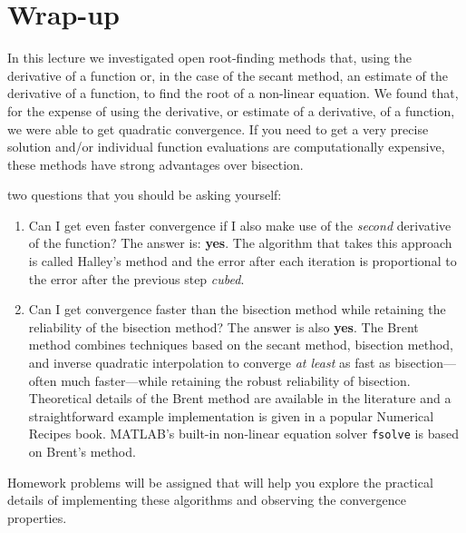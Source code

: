 \section{Wrap-up}
In this lecture we investigated open root-finding methods that, using the derivative of a function or, in the case of the secant method, an estimate of the derivative of a function, to find the root of a non-linear equation.  We found that, for the expense of using the derivative, or estimate of a derivative, of a function, we were able to get quadratic convergence.  If you need to get a very precise solution and/or individual function evaluations are computationally expensive, these methods have strong advantages over bisection.  

 two questions that you should be asking yourself:
\begin{enumerate}
\item Can I get even faster convergence if I also make use of the \emph{second} derivative of the function?  The answer is: \textbf{yes}.  The algorithm that takes this approach is called Halley's method\cite{gander1985halley} and the error after each iteration is proportional to the error after the previous step \emph{cubed}.

\item Can I get convergence faster than the bisection method while retaining the reliability of the bisection method?  The answer is also \textbf{yes}.  The Brent method combines techniques based on the secant method, bisection method, and inverse quadratic interpolation to converge \emph{at least} as fast as bisection---often much faster---while retaining the robust reliability of bisection.  Theoretical details of the Brent method are available in the literature\cite{forsythe1977computer} and a straightforward example implementation is given in a popular Numerical Recipes\cite{press1988numerical} book.  MATLAB's built-in non-linear equation solver \lstinline[style=myMatlab]{fsolve} is based on Brent's method.

\end{enumerate}
Homework problems will be assigned that will help you explore the practical details of implementing these algorithms and observing the convergence properties.
